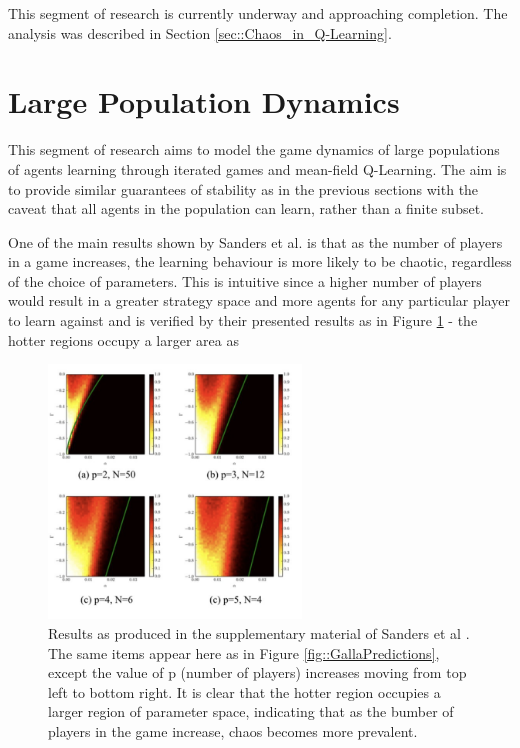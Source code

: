 \documentclass[.../main.tex]{subfiles}
\begin{document}
    This segment of research is currently underway and approaching completion. The analysis was
    described in Section \ref{sec::Chaos_in_Q-Learning}.

    \section{Large Population Dynamics} \label{sec::Large_Agent_Dynamics}

    This segment of research aims to model the game dynamics of large populations of agents
    learning through iterated games and mean-field Q-Learning. The aim is to provide similar
    guarantees of stability as in the previous sections with the caveat that all agents in the
    population can learn, rather than a finite subset.

    One of the main results shown by Sanders et al. \cite{Sanders2018} is that as the number of
    players in a game increases, the learning behaviour is more likely to be chaotic, regardless of
    the choice of parameters. This is intuitive since a higher number of players would result in a
    greater strategy space and more agents for any particular player to learn against and is
    verified by their presented results as in Figure \ref{fig::GallaPrevalence} - the hotter
    regions occupy a larger area as 

    \begin{figure}[h]
    	\centering
    	\includegraphics[width=0.6\textwidth]{Figures/GallaPrevalence}
    	\caption{ \label{fig::GallaPrevalence} Results as produced in the supplementary material
    	of Sanders et al \cite{Sanders2018}. The same items appear here as in Figure 
    	\ref{fig::GallaPredictions}, except the value of p (number of players) increases moving
    	from top left to bottom right. It is clear that the hotter region occupies a larger region
    	of parameter space, indicating that as the bumber of players in the game increase, chaos
    	becomes more prevalent.}
    \end{figure}
\end{document}
